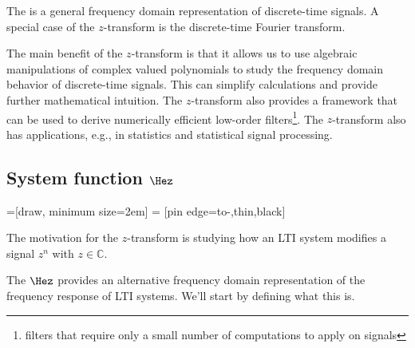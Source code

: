 The \emph{} is a general frequency
domain representation of discrete-time signals. A special case of the
$z$-transform is the discrete-time Fourier transform.

The main benefit of the $z$-transform is that it allows us to use
algebraic manipulations of complex valued polynomials to study the
frequency domain behavior of discrete-time signals. This can simplify
calculations and provide further mathematical intuition. The
$z$-transform also provides a framework that can be used to derive
numerically efficient low-order filters\footnote{filters that require only a small 
number of computations to apply on signals}. The $z$-transform
also has applications, e.g., in statistics and statistical signal
processing.

\subsection{System function $\Hez$}

=[draw, minimum size=2em]
 = [pin edge={to-,thin,black}]
\begin{marginfigure}
\begin{center}
\end{center}
\caption{The motivation for the $z$-transform is studying how an LTI system modifies a signal $z^n$ with $z\in \mathbb{C}$.}
\end{marginfigure}

The \emph{} $\Hez$ provides an
alternative frequency domain representation of the frequency response
of LTI systems. We'll start by defining what this is.

